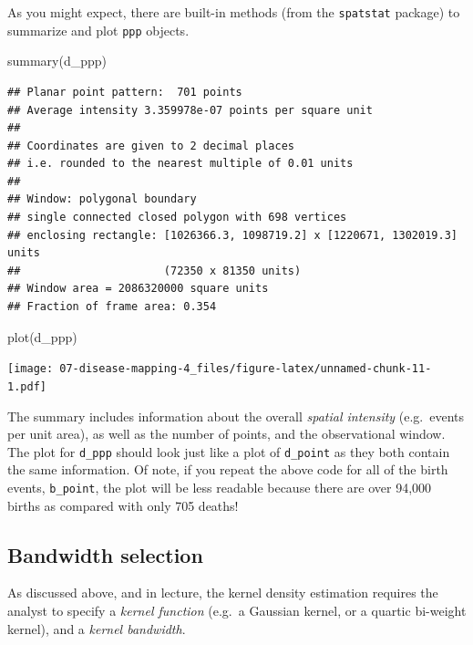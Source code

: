 \documentclass[
]{book}
\newenvironment{Shaded}{\begin{snugshade}}{\end{snugshade}}
\newcommand{\FunctionTok}[1]{\textcolor[rgb]{0.00,0.00,0.00}{#1}}
\newcommand{\NormalTok}[1]{#1}
\begin{document}
As you might expect, there are built-in methods (from the \texttt{spatstat} package) to summarize and plot \texttt{ppp} objects.

\begin{Shaded}
\begin{Highlighting}[]
\FunctionTok{summary}\NormalTok{(d\_ppp)}
\end{Highlighting}
\end{Shaded}

\begin{verbatim}
## Planar point pattern:  701 points
## Average intensity 3.359978e-07 points per square unit
## 
## Coordinates are given to 2 decimal places
## i.e. rounded to the nearest multiple of 0.01 units
## 
## Window: polygonal boundary
## single connected closed polygon with 698 vertices
## enclosing rectangle: [1026366.3, 1098719.2] x [1220671, 1302019.3] units
##                      (72350 x 81350 units)
## Window area = 2086320000 square units
## Fraction of frame area: 0.354
\end{verbatim}

\begin{Shaded}
\begin{Highlighting}[]
\FunctionTok{plot}\NormalTok{(d\_ppp)}
\end{Highlighting}
\end{Shaded}

\texttt{[image: 07-disease-mapping-4\_files/figure-latex/unnamed-chunk-11-1.pdf]}

The summary includes information about the overall \emph{spatial intensity} (e.g.~events per unit area), as well as the number of points, and the observational window. The plot for \texttt{d\_ppp} should look just like a plot of \texttt{d\_point} as they both contain the same information. Of note, if you repeat the above code for all of the birth events, \texttt{b\_point}, the plot will be less readable because there are over 94,000 births as compared with only 705 deaths!

\hypertarget{bandwidth-selection}{%
\subsection{Bandwidth selection}\label{bandwidth-selection}}

As discussed above, and in lecture, the kernel density estimation requires the analyst to specify a \emph{kernel function} (e.g.~a Gaussian kernel, or a quartic bi-weight kernel), and a \emph{kernel bandwidth}.
\end{document}

